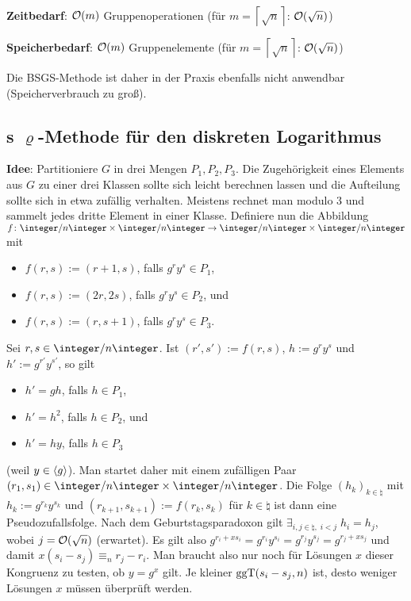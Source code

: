 \linie

\textbf{Zeitbedarf}:
$\mathcal{O}(m)$ Gruppenoperationen (für $m = \left\lceil\sqrt{n}\right\rceil$: $\mathcal{O}(\sqrt{n})$)

\textbf{Speicherbedarf}:
$\mathcal{O}(m)$ Gruppenelemente (für $m = \left\lceil\sqrt{n}\right\rceil$: $\mathcal{O}(\sqrt{n})$)

Die BSGS-Methode ist daher in der Praxis ebenfalls nicht anwendbar (Speicherverbrauch zu groß).

\pagebreak

\subsection{%
    s \texorpdfstring{$\varrho$}{ρ}-Methode für den diskreten Logarithmus%
}

\textbf{Idee}:
Partitioniere $G$ in drei Mengen $P_1, P_2, P_3$.
Die Zugehörigkeit eines Elements aus $G$ zu einer drei Klassen sollte sich leicht berechnen
lassen und die Aufteilung sollte sich in etwa zufällig verhalten.
Meistens rechnet man modulo $3$ und sammelt jedes dritte Element in einer Klasse.
Definiere nun die Abbildung $f\colon \ZnZ \times \ZnZ \rightarrow \ZnZ \times \ZnZ$ mit
\begin{itemize}
    \item
    $f(r, s) := (r + 1, s)$, falls $g^r y^s \in P_1$,

    \item
    $f(r, s) := (2r, 2s)$, falls $g^r y^s \in P_2$, und

    \item
    $f(r, s) := (r, s + 1)$, falls $g^r y^s \in P_3$.
\end{itemize}
Sei $r, s \in \ZnZ$.
Ist $(r', s') := f(r, s)$, $h := g^r y^s$ und $h' := g^{r'} y^{s'}$, so gilt
\begin{itemize}
    \item
    $h' = gh$, falls $h \in P_1$,

    \item
    $h' = h^2$, falls $h \in P_2$, und

    \item
    $h' = hy$, falls $h \in P_3$
\end{itemize}
(weil $y \in \langle g\rangle$).
Man startet daher mit einem zufälligen Paar $(r_1, s_1) \in \ZnZ \times \ZnZ$.
Die Folge $(h_k)_{k \in \natural}$ mit $h_k := g^{r_k} y^{s_k}$ und
$(r_{k+1}, s_{k+1}) := f(r_k, s_k)$ für $k \in \natural$ ist dann eine Pseudozufallsfolge.
Nach dem Geburtstagsparadoxon gilt $\exists_{i, j \in \natural,\; i < j}\; h_i = h_j$, wobei
$j = \mathcal{O}(\sqrt{n})$ (erwartet).
Es gilt also $g^{r_i+xs_i} = g^{r_i} y^{s_i} = g^{r_j} y^{s_j} = g^{r_j+xs_j}$
und damit $x(s_i - s_j) \equiv_n r_j - r_i$.
Man braucht also nur noch für Lösungen $x$ dieser Kongruenz zu testen, ob $y = g^x$ gilt.
Je kleiner $\operatorname{ggT}(s_i - s_j, n)$ ist, desto weniger Lösungen $x$ müssen überprüft werden.

